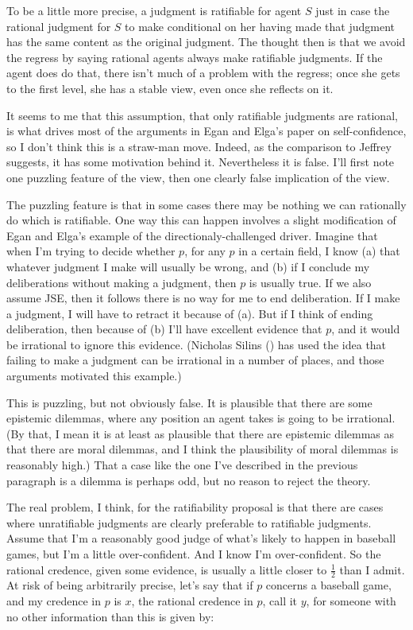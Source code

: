 \documentclass[
  11pt,
  letterpaper,
  DIV=11,
  numbers=noendperiod,
  oneside]{scrartcl}
\begin{document}
To be a little more precise, a judgment is ratifiable for agent \(S\)
just in case the rational judgment for \(S\) to make conditional on her
having made that judgment has the same content as the original judgment.
The thought then is that we avoid the regress by saying rational agents
always make ratifiable judgments. If the agent does do that, there isn't
much of a problem with the regress; once she gets to the first level,
she has a stable view, even once she reflects on it.

It seems to me that this assumption, that only ratifiable judgments are
rational, is what drives most of the arguments in Egan and Elga's paper
on self-confidence, so I don't think this is a straw-man move. Indeed,
as the comparison to Jeffrey suggests, it has some motivation behind it.
Nevertheless it is false. I'll first note one puzzling feature of the
view, then one clearly false implication of the view.

The puzzling feature is that in some cases there may be nothing we can
rationally do which is ratifiable. One way this can happen involves a
slight modification of Egan and Elga's example of the
directionaly-challenged driver. Imagine that when I'm trying to decide
whether \(p\), for any \(p\) in a certain field, I know (a) that
whatever judgment I make will usually be wrong, and (b) if I conclude my
deliberations without making a judgment, then \(p\) is usually true. If
we also assume JSE, then it follows there is no way for me to end
deliberation. If I make a judgment, I will have to retract it because of
(a). But if I think of ending deliberation, then because of (b) I'll
have excellent evidence that \(p\), and it would be irrational to ignore
this evidence. (Nicholas Silins () has
used the idea that failing to make a judgment can be irrational in a
number of places, and those arguments motivated this example.)

This is puzzling, but not obviously false. It is plausible that there
are some epistemic dilemmas, where any position an agent takes is going
to be irrational. (By that, I mean it is at least as plausible that
there are epistemic dilemmas as that there are moral dilemmas, and I
think the plausibility of moral dilemmas is reasonably high.) That a
case like the one I've described in the previous paragraph is a dilemma
is perhaps odd, but no reason to reject the theory.

The real problem, I think, for the ratifiability proposal is that there
are cases where unratifiable judgments are clearly preferable to
ratifiable judgments. Assume that I'm a reasonably good judge of what's
likely to happen in baseball games, but I'm a little over-confident. And
I know I'm over-confident. So the rational credence, given some
evidence, is usually a little closer to \(\frac{1}{2}\) than I admit. At
risk of being arbitrarily precise, let's say that if \(p\) concerns a
baseball game, and my credence in \(p\) is \(x\), the rational credence
in \(p\), call it \(y\), for someone with no other information than this
is given by:
\end{document}
